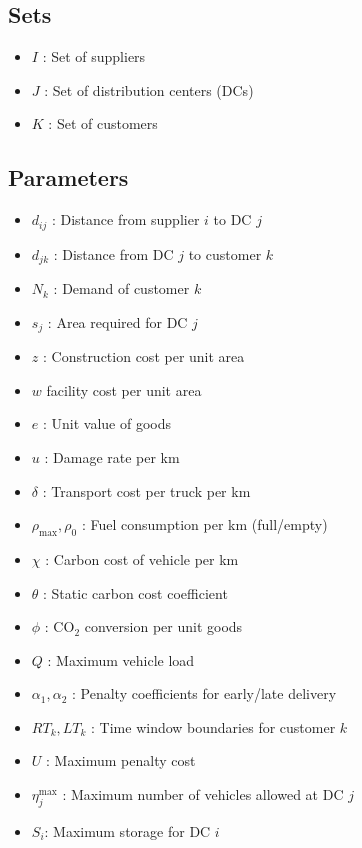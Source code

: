 \documentclass[conference]{IEEEtran}
\begin{document}
\subsection*{Sets}
\begin{itemize}
    \item $I$ : Set of suppliers
    \item $J$ : Set of distribution centers (DCs)
    \item $K$ : Set of customers
\end{itemize}

\subsection*{Parameters}
\begin{itemize}
    \item $d_{ij}$ : Distance from supplier $i$ to DC $j$
    \item $d_{jk}$ : Distance from DC $j$ to customer $k$
    \item $N_k$ : Demand of customer $k$
    \item $s_j$ : Area required for DC $j$
    \item $z$ : Construction cost per unit area
    \item $w$ facility cost per unit area
    \item $e$ : Unit value of goods
    \item $u$ : Damage rate per km
    \item $\delta$ : Transport cost per truck per km
    \item $\rho_{\max}, \rho_0$ : Fuel consumption per km (full/empty)
    \item $\chi$ : Carbon cost of vehicle per km
    \item $\theta$ : Static carbon cost coefficient
    \item $\phi$ : CO$_2$ conversion per unit goods
    \item $Q$ : Maximum vehicle load
    \item $\alpha_1, \alpha_2$ : Penalty coefficients for early/late delivery
    \item $RT_k, LT_k$ : Time window boundaries for customer $k$
    \item $U$ : Maximum penalty cost
    \item $\eta^{\max}_j$ : Maximum number of vehicles allowed at DC $j$
    \item $S_i$: Maximum storage for DC $i$
\end{itemize}
\end{document}

